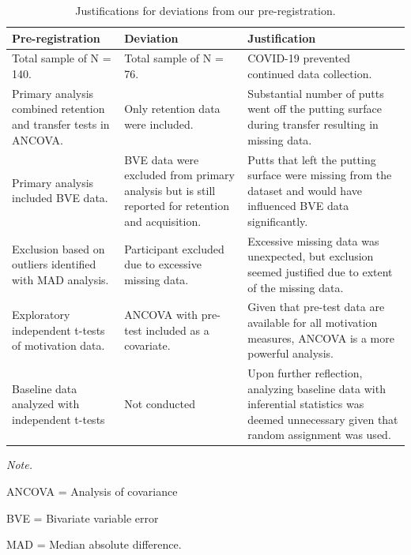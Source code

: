 \documentclass[
  english,
  man,floatsintext]{apa7}
\begin{document}
\begin{landscape}\begin{table}

\caption{\label{tab:table2}Justifications for deviations from our pre-registration.}
\fontsize{11}{13}\selectfont
\begin{threeparttable}
\begin{tabular}[t]{>{\raggedright\arraybackslash}p{14em}>{\raggedright\arraybackslash}p{16em}>{\raggedright\arraybackslash}p{25em}}
\toprule
Pre-registration & Deviation & Justification\\
\midrule
Total sample of N = 140. & Total sample of N = 76. & COVID-19 prevented continued data collection.\\
\addlinespace
Primary analysis combined retention and transfer tests in ANCOVA. & Only retention data were included. & Substantial number of putts went off the putting surface during transfer resulting in missing data.\\
\addlinespace
Primary analysis included BVE data. & BVE data were excluded from primary analysis but is still reported for retention and acquisition. & Putts that left the putting surface were missing from the dataset and would have influenced BVE data significantly.\\
\addlinespace
Exclusion based on outliers identified with MAD analysis. & Participant excluded due to excessive missing data. & Excessive missing data was unexpected, but exclusion seemed justified due to extent of the missing data.\\
\addlinespace
Exploratory independent t-tests of motivation data. & ANCOVA with pre-test included as a covariate. & Given that pre-test data are available for all motivation measures, ANCOVA is a more powerful analysis.\\
\addlinespace
Baseline data analyzed with independent t-tests & Not conducted & Upon further reflection, analyzing baseline data with inferential statistics was deemed unnecessary given that random assignment was used.\\
\bottomrule
\end{tabular}
\begin{tablenotes}
\item \textit{Note.} 
\item ANCOVA = Analysis of covariance
\item BVE = Bivariate variable error
\item MAD = Median absolute difference.
\end{tablenotes}
\end{threeparttable}
\end{table}
\end{landscape}
\end{document}
